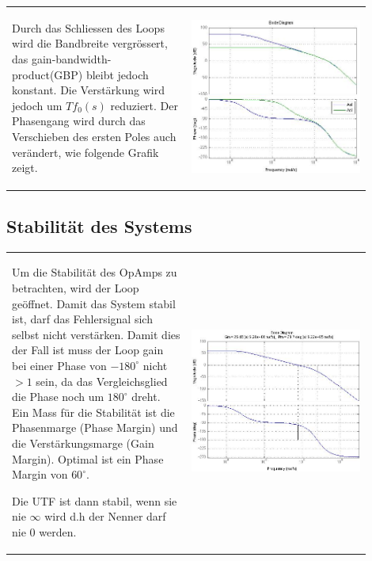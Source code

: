 \begin{tabular}{m{0.45\linewidth}m{0.45\linewidth}}
	Durch das Schliessen des Loops wird die Bandbreite vergrössert, das gain-bandwidth-product(GBP) bleibt jedoch konstant. Die Verstärkung wird jedoch um $Tf_0(s)$ reduziert. Der Phasengang wird durch das Verschieben des ersten Poles auch verändert, wie folgende Grafik zeigt.
	& \begin{center}
        \includegraphics[width=6.7cm, valign=t]{./pictures/AolAcl.png}
    \end{center}
\end{tabular}
\vspace{-7mm}
\subsection{Stabilität des Systems}
\begin{tabular}{m{0.45\linewidth}m{0.45\linewidth}}
    Um die Stabilität des OpAmps zu betrachten, wird der Loop geöffnet. Damit das System stabil ist, darf das       
    Fehlersignal sich selbst nicht verstärken. Damit dies der Fall ist muss der Loop gain bei einer Phase von $-180^\circ$
    nicht $>1$ sein, da das Vergleichsglied die Phase noch um $180^\circ$ dreht. Ein Mass für die Stabilität ist die 
    Phasenmarge (Phase Margin) und die Verstärkungsmarge (Gain Margin). Optimal ist ein Phase Margin von $60^{\circ}$.
    
    Die UTF ist dann stabil, wenn sie nie $\infty$ wird d.h der Nenner darf nie 0 werden.
    & \begin{center}
        \includegraphics[width=6.7cm, valign=t]{./pictures/margins.png}
    \end{center}
\end{tabular}


